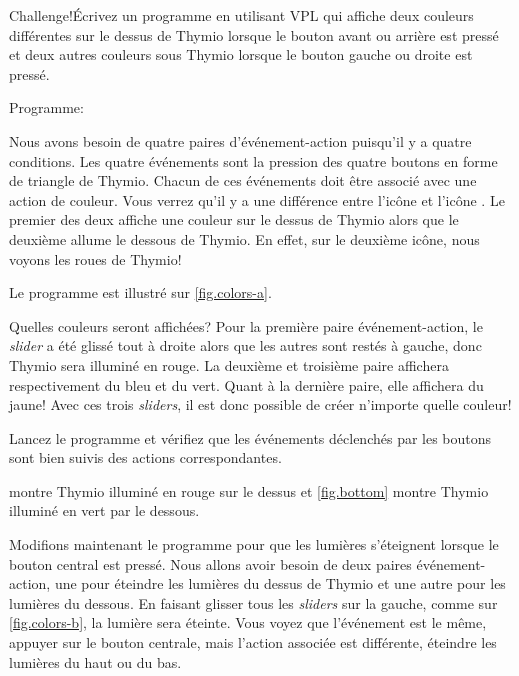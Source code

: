 

\begin{bclogo}[couleur = pink!30, arrondi = 0.1, logo = \bccrayon, ombre = true]{Challenge!}Écrivez un programme en utilisant VPL qui affiche deux couleurs différentes sur le dessus de Thymio lorsque le bouton avant ou arrière est pressé et deux autres couleurs sous Thymio lorsque le bouton gauche ou droite est pressé.
\end{bclogo}

{\raggedleft \hfill Programme: }

Nous avons besoin de quatre paires d'événement-action puisqu'il y a quatre conditions. Les quatre événements sont la pression des quatre boutons en forme de triangle de Thymio. Chacun de ces événements doit être associé avec une action de couleur. Vous verrez qu'il y a une différence entre l'icône  et l'icône . Le premier des deux affiche une couleur sur le dessus de Thymio alors que le deuxième allume le dessous de Thymio. En effet, sur le deuxième icône, nous voyons les roues de Thymio!

Le programme est illustré sur \cref{fig.colors-a}.

Quelles couleurs seront affichées? Pour la première paire événement-action, le \textit{slider} a été glissé tout à droite alors que les autres sont restés à gauche, donc Thymio sera illuminé en rouge. La deuxième et troisième paire affichera respectivement du bleu et du vert. Quant à la dernière paire, elle affichera du jaune! Avec ces trois \textit{sliders}, il est donc possible de créer n'importe quelle couleur! 

Lancez le programme et vérifiez que les événements déclenchés par les boutons sont bien suivis des actions correspondantes.

 montre Thymio illuminé en rouge sur le dessus et \cref{fig.bottom} montre Thymio illuminé en vert par le dessous.


Modifions maintenant le programme pour que les lumières s'éteignent lorsque le bouton central est pressé. Nous allons avoir besoin de deux paires événement-action, une pour éteindre les lumières du dessus de Thymio et une autre pour les lumières du dessous. En faisant glisser tous les \textit{sliders} sur la gauche, comme sur \cref{fig.colors-b}, la lumière sera éteinte. Vous voyez que l'événement est le même, appuyer sur le bouton centrale, mais l'action associée est différente, éteindre les lumières du haut ou du bas.

